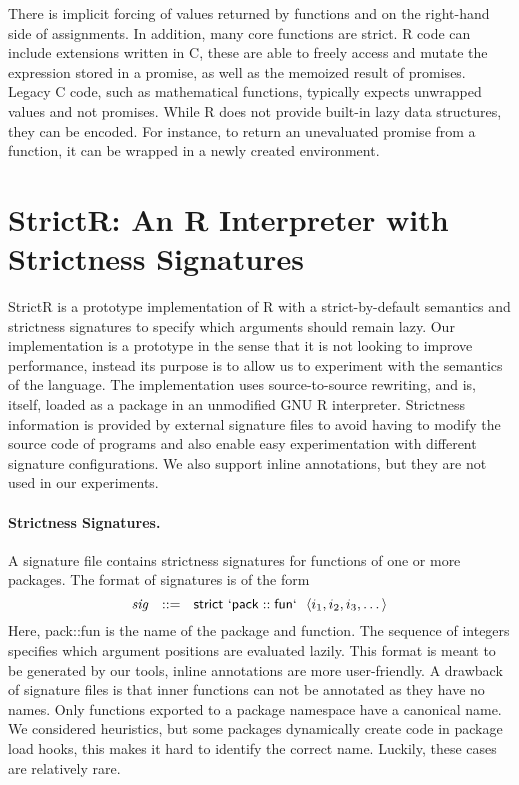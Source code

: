 \documentclass[review,creen,acmsmall]{acmart}
\newcommand{\strictr}{{\sf StrictR}\xspace}
\begin{document}
There is implicit forcing of values returned by functions and on the
right-hand side of assignments. In addition, many core functions are strict. R
code can include extensions written in C, these are able to freely access and
mutate the expression stored in a promise, as well as the memoized result of
promises. Legacy C code, such as mathematical functions, typically expects
unwrapped values and not promises. While R does not provide built-in lazy data
structures, they can be encoded. For instance, to return an
unevaluated promise from a function, it can be wrapped in a newly created
environment.

\section{StrictR: An R Interpreter with Strictness Signatures}\label{sec:strictr}

\strictr is a prototype implementation of R with a strict-by-default semantics
and strictness signatures to specify which arguments should remain lazy. Our
implementation is a prototype in the sense that it is not looking to improve
performance, instead its purpose is to allow us to experiment with the semantics
of the language. The implementation uses source-to-source rewriting, and is,
itself, loaded as a package in an unmodified GNU R interpreter.
Strictness information is provided by external signature files
to avoid having to modify the source code
of programs and also enable easy experimentation with different signature
configurations. We also support inline annotations, but they are not used in our
experiments.


\paragraph{Strictness Signatures.}
A signature file contains strictness signatures for functions of one or more
packages. The format of signatures is of the form
%
\[
\mathit{sig}~~::=~~\mathsf{strict}~\mathsf{`pack}::\mathsf{fun`}~~\langle i_1,
i_2, i_3, \dots\rangle
\]
%
Here, {\sf pack::fun} is the name of the package and function. The sequence of
integers specifies which argument positions are evaluated lazily. This format is
meant to be generated by our tools, inline annotations are more user-friendly. A
drawback of signature files is that inner functions can not be annotated as they
have no names. Only functions exported to a package namespace have a canonical
name. We considered heuristics, but some packages dynamically create code in
package load hooks, this makes it hard to identify the correct name. Luckily,
these cases are relatively rare.
\end{document}
